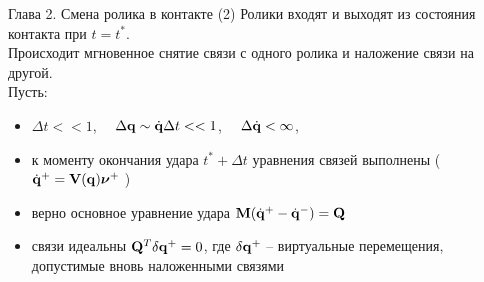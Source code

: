 \begin{frame}{Глава 2. Смена ролика в контакте}
    \textcolor{Periwinkle}{(2) Ролики входят и выходят из состояния контакта при $t = t^*$.}\\
    Происходит мгновенное снятие связи с одного ролика и наложение связи на другой.\\
    Пусть:
    \begin{itemize}
        \item $\Delta t << 1$, $\quad \Delta \mathbf{q} \sim \dot{\mathbf{q}}\Delta t << 1$, $\quad \Delta \dot{\mathbf{q}} < \infty$,
        \item к моменту окончания удара $t^*+\Delta t$ уравнения связей выполнены (\enspace $\dot{\mathbf{q}}^+ = \mathbf{V}(\mathbf{q})\boldsymbol{\mathbf{\nu}}^+ \ $)
        \item верно основное уравнение удара \enspace $\mathbf{M} (\dot{\mathbf{q}}^+ - \dot{\mathbf{q}}^-) = \mathbf{Q}$
        \item связи идеальны \enspace $\mathbf{Q}^T\delta\mathbf{q}^+ = 0$, где $\delta\mathbf{q}^+$ -- виртуальные перемещения, допустимые вновь наложенными связями
    \end{itemize}
\end{frame}
